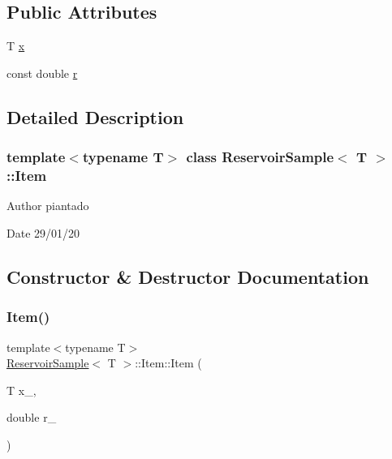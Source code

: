 \subsection*{Public Attributes}
\begin{DoxyCompactItemize}
\item 
T \hyperlink{class_reservoir_sample_1_1_item_abc1ea374480d6d86d0466e4683c98337}{x}
\item 
const double \hyperlink{class_reservoir_sample_1_1_item_ad74b6fb33eb3a534eeb4141c735dfaf5}{r}
\end{DoxyCompactItemize}


\subsection{Detailed Description}
\subsubsection*{template$<$typename T$>$\newline
class Reservoir\+Sample$<$ T $>$\+::\+Item}

\begin{DoxyAuthor}{Author}
piantado 
\end{DoxyAuthor}
\begin{DoxyDate}{Date}
29/01/20 
\end{DoxyDate}


\subsection{Constructor \& Destructor Documentation}
\mbox{\label{class_reservoir_sample_1_1_item_a01a115a4bc68485d3349d61b85388998}} 
\subsubsection{\texorpdfstring{Item()}{Item()}}
{\footnotesize\ttfamily template$<$typename T$>$ \\
\hyperlink{class_reservoir_sample}{Reservoir\+Sample}$<$ T $>$\+::Item\+::\+Item (\begin{DoxyParamCaption}\item[{T}]{x\+\_\+,  }\item[{double}]{r\+\_\+ }\end{DoxyParamCaption})\hspace{0.3cm}{\ttfamily [inline]}}



